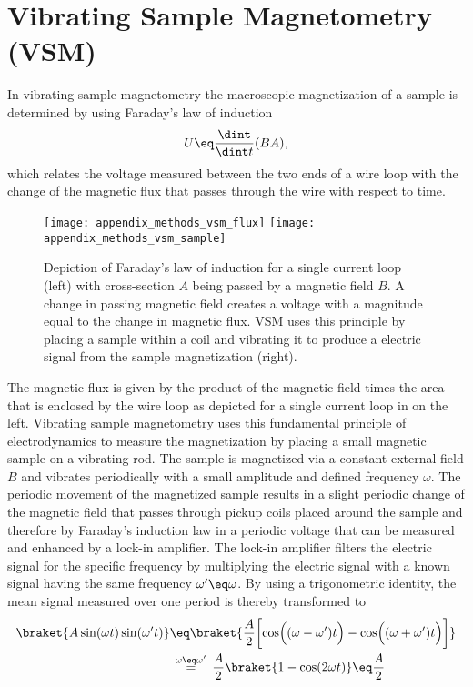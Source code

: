 \documentclass[\main/dresen_thesis.tex]{subfiles}
\begin{document}
  \section{Vibrating Sample Magnetometry (VSM)}
    \label{ch:methods:vsm}
    In vibrating sample magnetometry the macroscopic magnetization of a sample is determined by using Faraday's law of induction
    \begin{align}
      U \eq \frac{\dint }{\dint t} (BA),
    \end{align}
    which relates the voltage measured between the two ends of a wire loop with the change of the magnetic flux that passes through the wire with respect to time.
    \begin{figure}[tb]
      \centering
      \texttt{[image: appendix\_methods\_vsm\_flux]}
      \texttt{[image: appendix\_methods\_vsm\_sample]}
      \caption{\label{fig:methods:vsm:flux}Depiction of Faraday's law of induction for a single current loop (left) with cross-section $A$ being passed by a magnetic field $B$. A change in passing magnetic field creates a voltage with a magnitude equal to the change in magnetic flux. VSM uses this principle by placing a sample within a coil and vibrating it to produce a electric signal from the sample magnetization (right).}
    \end{figure}
    The magnetic flux is given by the product of the magnetic field times the area that is enclosed by the wire loop as depicted for a single current loop in  on the left.
    Vibrating sample magnetometry uses this fundamental principle of electrodynamics to measure the magnetization by placing a small magnetic sample on a vibrating rod.
    The sample is magnetized via a constant external field $B$ and vibrates periodically with a small amplitude and defined frequency $\omega$.
    The periodic movement of the magnetized sample results in a slight periodic change of the magnetic field that passes through pickup coils placed around the sample and therefore by Faraday's induction law in a periodic voltage that can be measured and enhanced by a lock-in amplifier.
    The lock-in amplifier filters the electric signal for the specific frequency by multiplying the electric signal with a known signal having the same frequency $\omega^\prime \eq \omega$.
    By using a trigonometric identity, the mean signal measured over one period is thereby transformed to
    \begin{align}
      \begin{split}
        \braket{A \sin(\omega t) \sin(\omega^\prime t)}
          &\eq \braket{\frac{A}{2} \biggl[ \cos\Bigl((\omega - \omega^\prime) t \Bigr) - \cos\Bigl((\omega + \omega^\prime) t\Bigr) \biggr]}\\
          &\,\stackrel{\omega \eq \omega^\prime}{=}\, \frac{A}{2} \braket{1 - \cos(2\omega t)} \eq \frac{A}{2}\\
      \end{split}
    \end{align}
\end{document}
